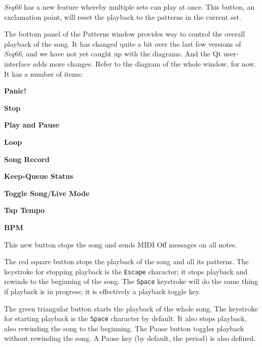    \textsl{Seq66} has a new feature whereby multiple sets can play at once.
   This button, an exclamation point, will reset the playback to the patterns
   in the current set.

   The bottom panel of the Patterns window provides way to control the
   overall playback of the song.  It has changed quite a bit over the last few
   versions of \textsl{Seq66}, and we have not yet caught up with the
   diagrams. And the Qt user-interface adds more changes.
   Refer to the diagram of the whole window, for now.
   It has a number of items:

   \begin{enumber}
      \item \textbf{Panic!}
      \item \textbf{Stop}
      \item \textbf{Play and Pause}
      \item \textbf{Loop}
      \item \textbf{Song Record}
      \item \textbf{Keep-Queue Status}
      \item \textbf{Toggle Song/Live Mode}
      \item \textbf{Tap Tempo}
      \item \textbf{BPM}
   \end{enumber}

   \setcounter{ItemCounter}{0}      %

   This new button stops the song and sends MIDI Off messages on all notes.

   The red square button stops the playback of the song and all its patterns.
   The keystroke for stopping playback is the \texttt{Escape} character; it
   stops playback and rewinds to the beginning of the song.
   The \texttt{Space} keystroke will do the same thing if playback is in
   progress; it is effectively a playback toggle key.

   The green triangular button starts the playback of the whole song.
   The keystroke for starting playback is the \texttt{Space} character by
   default.  It also stops playback, also rewinding the song to the beginning.
   The Pause button toggles playback without rewinding the song.
   A Pause key (by default, the period) is also defined.

